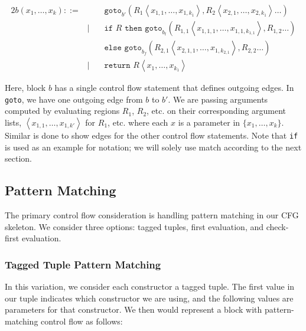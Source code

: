 \documentclass{article}
\begin{document}
\begin{alignat*}{2}
b(x_1, \dots, x_k) ::=&\, &&\texttt{goto}_{b'} \left( R_1 \left\langle x_{1,1}, \dots, x_{1,k_1} \right\rangle , R_2 \left\langle x_{2,1}, \dots, x_{2,k_1} \right\rangle \dots\right) \\
    &|\, &&\texttt{if } R \texttt{ then } \texttt{goto}_{b_t} \left( R_{1,1} \left\langle x_{1,1,1}, \dots, x_{1,1,k_{1,1}} \right\rangle , R_{1,2}\dots\right)\\
    & &&\texttt{else } \texttt{goto}_{b_f} \left( R_{2,1} \left\langle x_{2,1,1}, \dots, x_{1,k_{2,1}} \right\rangle, R_{2,2} \dots\right) \\
    &| &&\texttt{return } R \left\langle x_{1}, \dots, x_{k_1} \right\rangle
\end{alignat*}

Here, block $b$ has a single control flow statement that defines outgoing edges. In \texttt{goto}, we have one outgoing edge from $b$ to $b'$. We are passing arguments computed by evaluating regions $R_1$, $R_2$, etc. on their corresponding argument lists, $ \left\langle x_{1,1}, \dots, x_{1,k'} \right\rangle$ for $R_1$, etc. where each $x$ is a parameter in $\{x_1, \dots, x_k\}$. Similar is done to show edges for the other control flow statements. Note that \texttt{if} is used as an example for notation; we will solely use match according to the next section.


\subsection{Pattern Matching}

The primary control flow consideration is handling pattern matching in our CFG skeleton. We consider three options: tagged tuples, first evaluation, and check-first evaluation.

\subsubsection{Tagged Tuple Pattern Matching}

In this variation, we consider each constructor a tagged tuple. The first value in our tuple indicates which constructor we are using, and the following values are parameters for that constructor. We then would represent a block with pattern-matching control flow as follows:
\end{document}

